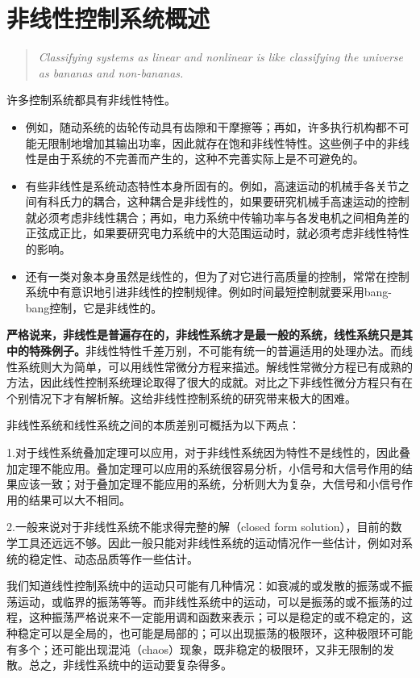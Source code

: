 \section{非线性控制系统概述}
\begin{quote}
  \textit{Classifying systems as linear and nonlinear is like classifying the universe as bananas and non-bananas.}
\end{quote}

许多控制系统都具有非线性特性。
\begin{itemize}[leftmargin=2em]
  \item 例如，随动系统的齿轮传动具有齿隙和干摩擦等；再如，许多执行机构都不可能无限制地增加其输出功率，因此就存在饱和非线性特性。这些例子中的非线性是由于系统的不完善而产生的，这种不完善实际上是不可避免的。
  \item 有些非线性是系统动态特性本身所固有的。例如，高速运动的机械手各关节之间有科氏力的耦合，这种耦合是非线性的，如果要研究机械手高速运动的控制就必须考虑非线性耦合；再如，电力系统中传输功率与各发电机之间相角差的正弦成正比，如果要研究电力系统中的大范围运动时，就必须考虑非线性特性的影响。
  \item 还有一类对象本身虽然是线性的，但为了对它进行高质量的控制，常常在控制系统中有意识地引进非线性的控制规律。例如时间最短控制就要采用bang-bang控制，它是非线性的。
\end{itemize}

{\bf 严格说来，非线性是普遍存在的，非线性系统才是最一般的系统，线性系统只是其中的特殊例子。}非线性特性千差万别，不可能有统一的普遍适用的处理办法。而线性系统则大为简单，可以用线性常微分方程来描述。解线性常微分方程已有成熟的方法，因此线性控制系统理论取得了很大的成就。对比之下非线性微分方程只有在个别情况下才有解析解。这给非线性控制系统的研究带来极大的困难。

非线性系统和线性系统之间的本质差别可概括为以下两点：

1.对于线性系统叠加定理可以应用，对于非线性系统因为特性不是线性的，因此叠加定理不能应用。叠加定理可以应用的系统很容易分析，小信号和大信号作用的结果应该一致；对于叠加定理不能应用的系统，分析则大为复杂，大信号和小信号作用的结果可以大不相同。

2.一般来说对于非线性系统不能求得完整的解（closed form solution），目前的数学工具还远远不够。因此一般只能对非线性系统的运动情况作一些估计，例如对系统的稳定性、动态品质等作一些估计。

我们知道线性控制系统中的运动只可能有几种情况：如衰减的或发散的振荡或不振荡运动，或临界的振荡等等。而非线性系统中的运动，可以是振荡的或不振荡的过程，这种振荡严格说来不一定能用调和函数来表示；可以是稳定的或不稳定的，这种稳定可以是全局的，也可能是局部的；可以出现振荡的极限环，这种极限环可能有多个；还可能出现混沌（chaos）现象，既非稳定的极限环，又非无限制的发散。总之，非线性系统中的运动要复杂得多。


